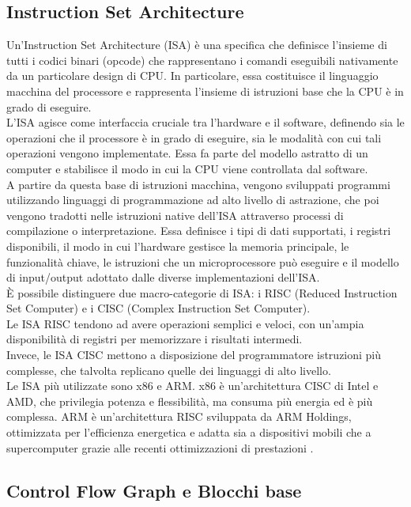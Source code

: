 \documentclass[12pt,a4paper,openright,twoside]{report}
\begin{document}
\subsection{Instruction Set Architecture}
Un'Instruction Set Architecture (ISA) \cite{ISA} è una specifica che definisce l'insieme di tutti i codici binari (opcode) che rappresentano i comandi eseguibili nativamente da un particolare design di CPU. In particolare, essa costituisce il linguaggio macchina del processore e rappresenta l'insieme di istruzioni base che la CPU è in grado di eseguire.\\
L'ISA agisce come interfaccia cruciale tra l'hardware e il software, definendo sia le operazioni che il processore è in grado di eseguire, sia le modalità con cui tali operazioni vengono implementate. Essa fa parte del modello astratto di un computer e stabilisce il modo in cui la CPU viene controllata dal software.\\
A partire da questa base di istruzioni macchina, vengono sviluppati programmi utilizzando linguaggi di programmazione ad alto livello di astrazione, che poi vengono tradotti nelle istruzioni native dell'ISA attraverso processi di compilazione o interpretazione. Essa definisce i tipi di dati supportati, i registri disponibili, il modo in cui l’hardware gestisce la memoria principale, le funzionalità chiave, le istruzioni che un microprocessore può eseguire e il modello di input/output adottato dalle diverse implementazioni dell’ISA.\\
È possibile distinguere due macro-categorie di ISA: i RISC (Reduced Instruction Set Computer) e i CISC (Complex Instruction Set Computer).\\ Le ISA RISC tendono ad avere operazioni semplici e veloci, con un'ampia disponibilità di registri per memorizzare i risultati intermedi.\\
Invece, le ISA CISC mettono a disposizione del programmatore istruzioni più complesse, che talvolta replicano quelle dei linguaggi di alto livello.\\
Le ISA più utilizzate sono x86 e ARM. x86 è un'architettura CISC di Intel e AMD, che privilegia potenza e flessibilità, ma consuma più energia ed è più complessa. ARM è un'architettura RISC sviluppata da ARM Holdings, ottimizzata per l'efficienza energetica e adatta sia a dispositivi mobili che a supercomputer grazie alle recenti ottimizzazioni di prestazioni \cite{redhat}. 
\newpage

\subsection{Control Flow Graph e Blocchi base}
\end{document}
